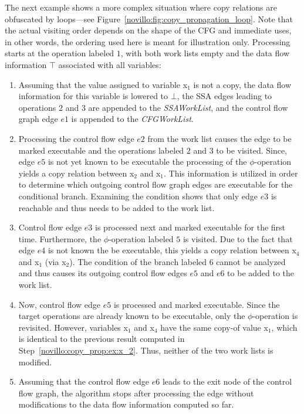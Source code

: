 The next example shows a more complex situation where copy relations are
obfuscated by loops---see Figure~\ref{novillo:fig:copy_propagation_loop}.  Note
that the actual visiting order depends on the shape of the CFG and immediate
uses, in other words, the ordering used here is meant for illustration only.
Processing starts
at the operation labeled $1$, with both work lists empty and the data flow
information $\top$ associated with all variables:

\begin{enumerate}
\item Assuming that the value assigned to variable x$_1$ is not a copy, the data
      flow information for this variable is lowered to $\bot$, the SSA edges
      leading to operations $2$ and $3$ are appended to the \emph{SSAWorkList},
      and the control flow graph edge $e1$ is appended to the \emph{CFGWorkList}.
\item \label{novillo:copy_prop:ex:x_2} Processing the control flow edge $e2$ from the
      work list causes the edge to be marked executable and the operations
      labeled $2$ and $3$ to be visited. Since, edge $e5$ is not yet known to be
      executable the processing of the $\phi$-operation yields a copy relation
      between x$_2$ and x$_1$. This information is utilized in order to
      determine which outgoing control flow graph edges are executable for the
      conditional branch. Examining the condition shows that only edge $e3$ is
      reachable and thus needs to be added to the work list.
\item Control flow edge $e3$ is processed next and marked executable for the
      first time.
      Furthermore, the $\phi$-operation labeled $5$ is visited. Due to the fact
      that edge $e4$ is not known the be executable, this yields a
      copy relation between x$_4$ and x$_1$ (via x$_2$). The condition of the
      branch labeled $6$ cannot be analyzed and thus causes its outgoing control
      flow edges $e5$ and $e6$ to be added to the work list.
\item Now, control flow edge $e5$ is processed and marked executable. Since the
      target
      operations are already known to be executable, only the $\phi$-operation
      is revisited. However, variables x$_1$ and x$_4$ have the same copy-of
      value x$_1$, which is identical to the previous result computed in
      Step~\ref{novillo:copy_prop:ex:x_2}. Thus, neither of the two work lists
      is modified.
\item Assuming that the control flow edge $e6$ leads to the exit node of the
      control flow graph,
      the algorithm stops after processing the edge without modifications to
      the data flow information computed so far.
\end{enumerate}

